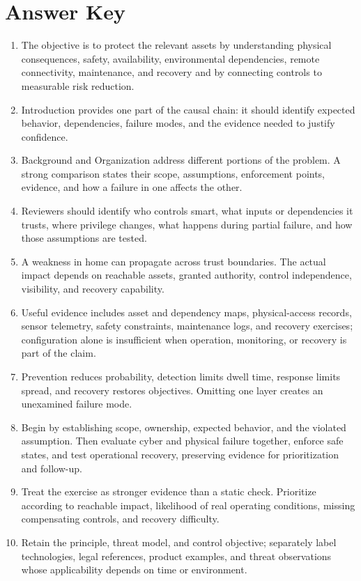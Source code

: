 \documentclass[11pt]{article}
\begin{document}
\section*{Answer Key}
\begin{enumerate}
\item The objective is to protect the relevant assets by understanding physical consequences, safety, availability, environmental dependencies, remote connectivity, maintenance, and recovery and by connecting controls to measurable risk reduction.
\item Introduction provides one part of the causal chain: it should identify expected behavior, dependencies, failure modes, and the evidence needed to justify confidence.
\item Background and Organization address different portions of the problem. A strong comparison states their scope, assumptions, enforcement points, evidence, and how a failure in one affects the other.
\item Reviewers should identify who controls smart, what inputs or dependencies it trusts, where privilege changes, what happens during partial failure, and how those assumptions are tested.
\item A weakness in home can propagate across trust boundaries. The actual impact depends on reachable assets, granted authority, control independence, visibility, and recovery capability.
\item Useful evidence includes asset and dependency maps, physical-access records, sensor telemetry, safety constraints, maintenance logs, and recovery exercises; configuration alone is insufficient when operation, monitoring, or recovery is part of the claim.
\item Prevention reduces probability, detection limits dwell time, response limits spread, and recovery restores objectives. Omitting one layer creates an unexamined failure mode.
\item Begin by establishing scope, ownership, expected behavior, and the violated assumption. Then evaluate cyber and physical failure together, enforce safe states, and test operational recovery, preserving evidence for prioritization and follow-up.
\item Treat the exercise as stronger evidence than a static check. Prioritize according to reachable impact, likelihood of real operating conditions, missing compensating controls, and recovery difficulty.
\item Retain the principle, threat model, and control objective; separately label technologies, legal references, product examples, and threat observations whose applicability depends on time or environment.
\end{enumerate}
\end{document}
